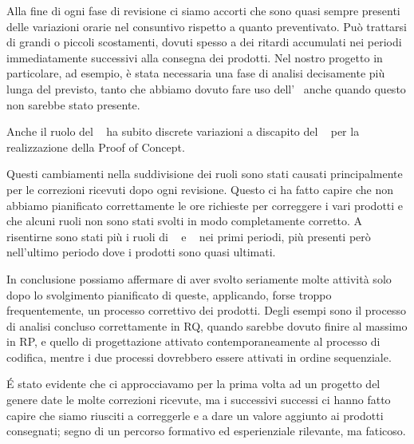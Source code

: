     Alla fine di ogni fase di revisione ci siamo accorti che sono quasi sempre presenti delle variazioni orarie nel consuntivo rispetto a quanto preventivato.
    Può trattarsi di grandi o piccoli scostamenti, dovuti spesso a dei ritardi accumulati nei periodi immediatamente successivi alla consegna dei prodotti.
    Nel nostro progetto in particolare, ad esempio, è stata necessaria una fase di analisi decisamente più lunga del previsto, tanto che abbiamo dovuto fare uso dell'\Ana~ anche quando questo non sarebbe stato presente. \par
    Anche il ruolo del \Prog~ ha subito discrete variazioni a discapito del \Progr~ per la realizzazione della Proof of Concept. \par
    Questi cambiamenti nella suddivisione dei ruoli sono stati causati principalmente per le correzioni ricevuti dopo ogni revisione. Questo ci ha fatto capire che non abbiamo pianificato correttamente le ore richieste per correggere i vari prodotti e che alcuni ruoli non sono stati svolti in modo completamente corretto. A risentirne sono stati più i ruoli di \Res~ e \Ver~ nei primi periodi, più presenti però nell'ultimo periodo dove i prodotti sono quasi ultimati. \par
    In conclusione possiamo affermare di aver svolto seriamente molte attività solo dopo lo svolgimento pianificato di queste, applicando, forse troppo frequentemente, un processo correttivo dei prodotti. Degli esempi sono il processo di analisi concluso correttamente in RQ, quando sarebbe dovuto finire al massimo in RP, e quello di progettazione attivato contemporaneamente al processo di codifica, mentre i due processi dovrebbero essere attivati in ordine sequenziale. \par
    \'E stato evidente che ci approcciavamo per la prima volta ad un progetto del genere date le molte correzioni ricevute, ma i successivi successi ci hanno fatto capire che siamo riusciti a correggerle e a dare un valore aggiunto ai prodotti consegnati; segno di un percorso formativo ed esperienziale rilevante, ma faticoso.
